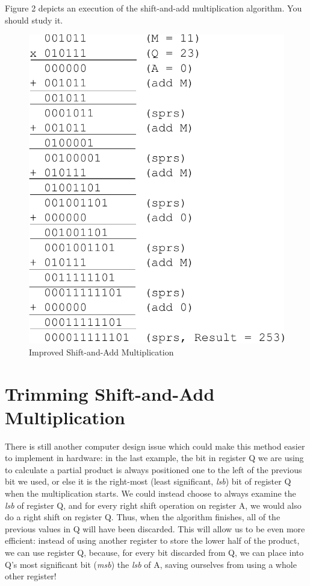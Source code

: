 \documentclass{article}
\begin{document}
Figure 2 depicts an execution of the shift-and-add multiplication algorithm.
You should study it.

\begin{figure}[h]
\centering
\includegraphics[scale=0.7]{isaam2.pdf}
\caption{Improved Shift-and-Add Multiplication}
\end{figure}

\section{Trimming Shift-and-Add Multiplication}

There is still another computer design issue which could make this method easier to implement in hardware: in the last example, the bit in register Q we are using to calculate a partial product is always positioned one to the left of the previous bit we used, or else it is the right-most (least significant, \emph{lsb}) bit of register Q when the multiplication starts.
We could instead choose to always examine the \emph{lsb} of register Q, and for every right shift operation on register A, we would also do a right shift on register Q.
Thus, when the algorithm finishes, all of the previous values in Q will have been discarded.
This will allow us to be even more efficient: instead of using another register to store the lower half of the product, we can use register Q, because, for every bit discarded from Q, we can place into Q's most significant bit (\emph{msb}) the \emph{lsb} of A, saving ourselves from using a whole other register!
\end{document}
